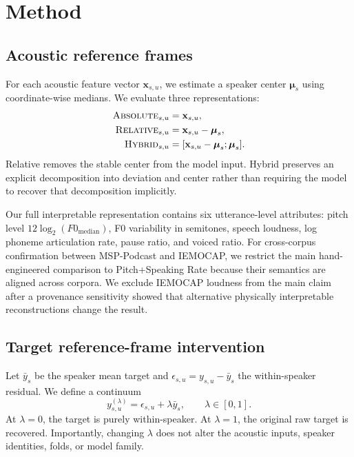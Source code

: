 \documentclass[11pt]{article}
\begin{document}
\section{Method}

\subsection{Acoustic reference frames}

For each acoustic feature vector $\mathbf{x}_{s,u}$, we estimate a speaker center $\boldsymbol{\mu}_s$ using coordinate-wise medians.
We evaluate three representations:
\begin{align}
    \textsc{Absolute}_{s,u} &= \mathbf{x}_{s,u},\\
    \textsc{Relative}_{s,u} &= \mathbf{x}_{s,u}-\boldsymbol{\mu}_s,\\
    \textsc{Hybrid}_{s,u} &= [\mathbf{x}_{s,u}-\boldsymbol{\mu}_s;\boldsymbol{\mu}_s].
\end{align}
Relative removes the stable center from the model input.
Hybrid preserves an explicit decomposition into deviation and center rather than requiring the model to recover that decomposition implicitly.

Our full interpretable representation contains six utterance-level attributes: pitch level $12\log_2(F0_{\mathrm{median}})$, F0 variability in semitones, speech loudness, log phoneme articulation rate, pause ratio, and voiced ratio.
For cross-corpus confirmation between MSP-Podcast and IEMOCAP, we restrict the main hand-engineered comparison to Pitch+Speaking Rate because their semantics are aligned across corpora.
We exclude IEMOCAP loudness from the main claim after a provenance sensitivity showed that alternative physically interpretable reconstructions change the result.

\subsection{Target reference-frame intervention}

Let $\bar{y}_s$ be the speaker mean target and $\epsilon_{s,u}=y_{s,u}-\bar{y}_s$ the within-speaker residual.
We define a continuum
\begin{equation}
    y^{(\lambda)}_{s,u} = \epsilon_{s,u}+\lambda\bar{y}_s,\qquad \lambda\in[0,1].
\end{equation}
At $\lambda=0$, the target is purely within-speaker.
At $\lambda=1$, the original raw target is recovered.
Importantly, changing $\lambda$ does not alter the acoustic inputs, speaker identities, folds, or model family.
\end{document}
